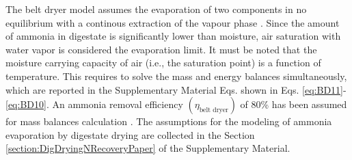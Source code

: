 \begin{refsection}[referencesCh6]
The belt dryer model assumes the evaporation of two components in no equilibrium with a continous extraction of the vapour phase \citep{treybal1980mass}.
Since the amount of ammonia in digestate is significantly lower than moisture, air saturation with water vapor is considered the evaporation limit. It must be noted that the moisture carrying capacity of air (i.e., the saturation point) is a function of temperature. This requires to solve the mass and energy balances simultaneously, which are reported in the
Supplementary Material
Eqs.
shown in Eqs. \ref{eq:BD11}-\ref{eq:BD10}.
An ammonia removal efficiency $\left(\eta_{\text{belt dryer}}\right)$ of 80\% has been assumed for mass balances calculation
\citep{awiszus2018ammonia}.
The assumptions for the modeling of ammonia evaporation by digestate drying are collected in
the Section \ref{section:DigDryingNRecoveryPaper} of the Supplementary Material.
%

\end{refsection}
